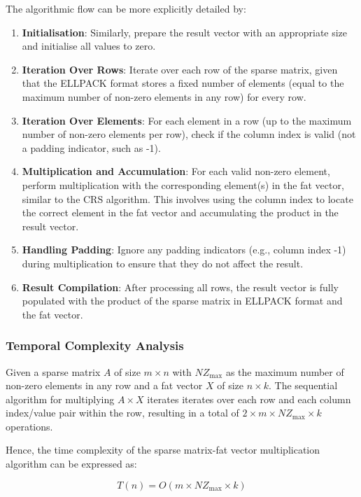 \documentclass[12pt,oneside]{book} %
\begin{document}
The algorithmic flow can be more explicitly detailed by:
\begin{enumerate}
    \item \textbf{Initialisation}: Similarly, prepare the result vector with an appropriate size and initialise all values to zero.
    \item \textbf{Iteration Over Rows}: Iterate over each row of the sparse matrix, given that the ELLPACK format stores a fixed number of elements (equal to the maximum number of non-zero elements in any row) for every row.
    \item \textbf{Iteration Over Elements}: For each element in a row (up to the maximum number of non-zero elements per row), check if the column index is valid (not a padding indicator, such as -1).
    \item \textbf{Multiplication and Accumulation}: For each valid non-zero element, perform multiplication with the corresponding element(s) in the fat vector, similar to the CRS algorithm. This involves using the column index to locate the correct element in the fat vector and accumulating the product in the result vector.
    \item \textbf{Handling Padding}: Ignore any padding indicators (e.g., column index -1) during multiplication to ensure that they do not affect the result.
    \item \textbf{Result Compilation}: After processing all rows, the result vector is fully populated with the product of the sparse matrix in ELLPACK format and the fat vector.
\end{enumerate}

\subsubsection{Temporal Complexity Analysis}

Given a sparse matrix \(A\) of size \(m \times n\) with \(NZ_{\text{max}}\) as
the maximum number of non-zero elements in any row and a fat vector $X$ of size
$n \times k$. The sequential algorithm for multiplying \(A \times X\) iterates
iterates over each row and each column index/value pair within the row,
resulting in a total of \(2 \times m \times NZ_{\text{max}} \times k\)
operations.

Hence, the time complexity of the sparse matrix-fat vector multiplication
algorithm can be expressed as:

\begin{equation}
    T(n) = O(m \times NZ_{\text{max}} \times k)
\end{equation}
\end{document}
